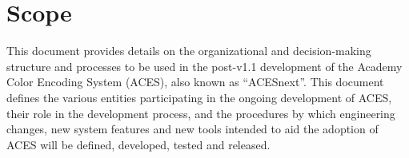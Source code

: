 \cleardoublepage
\numberedformat	
\chapter{Scope} 	%

This document provides details on the organizational and decision-making structure and processes to be used in the post-v1.1 development of the Academy Color Encoding System (ACES), also known as ``ACESnext''. This document defines the various entities participating in the ongoing development of ACES, their role in the development process, and the procedures by which engineering changes, new system features and new tools intended to aid the adoption of ACES will be defined, developed, tested and released.